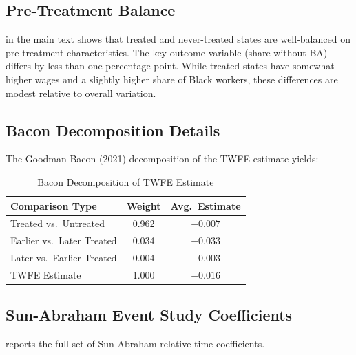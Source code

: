 \documentclass[12pt]{article}
\begin{document}
\subsection{Pre-Treatment Balance}

 in the main text shows that treated and never-treated states are well-balanced on pre-treatment characteristics. The key outcome variable (share without BA) differs by less than one percentage point. While treated states have somewhat higher wages and a slightly higher share of Black workers, these differences are modest relative to overall variation.

\subsection{Bacon Decomposition Details}

The Goodman-Bacon (2021) decomposition of the TWFE estimate yields:

\begin{table}[H]
\centering
\caption{Bacon Decomposition of TWFE Estimate}
\label{tab:bacon}
\begin{tabular}{lcc}
\toprule
Comparison Type & Weight & Avg.\ Estimate \\
\midrule
Treated vs.\ Untreated & 0.962 & $-0.007$ \\
Earlier vs.\ Later Treated & 0.034 & $-0.033$ \\
Later vs.\ Earlier Treated & 0.004 & $-0.003$ \\
\midrule
TWFE Estimate & 1.000 & $-0.016$ \\
\bottomrule
\end{tabular}
\end{table}

\subsection{Sun-Abraham Event Study Coefficients}

 reports the full set of Sun-Abraham relative-time coefficients.
\end{document}
